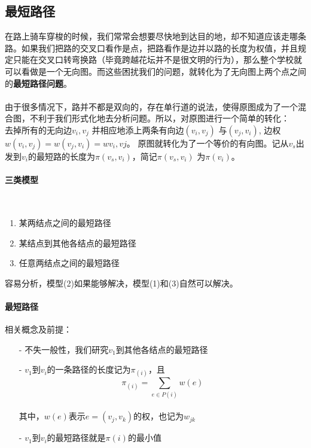\documentclass[11pt,a4paper,openany]{book}
\begin{document}
\subsection{最短路径}
\indent 在路上骑车穿梭的时候，我们常常会想要尽快地到达目的地，却不知道应该走哪条路。如果我们把路的交叉口看作是点，把路看作是边并以路的长度为权值，并且规定只能在交叉口转弯换路（毕竟跨越花坛并不是很文明的行为），那么整个学校就可以看做是一个无向图。而这些困扰我们的问题，就转化为了无向图上两个点之间的\textbf{最短路径问题}。\\
\paragraph{}由于很多情况下，路并不都是双向的，存在单行道的说法，使得原图成为了一个混合图，不利于我们形式化地去分析问题。所以，对原图进行一个简单的转化：\\
去掉所有的无向边${v_i,v_j}$ 并相应地添上两条有向边$(v_i,v_j)$ 与$(v_j,v_i)$, 边权$w(v_i,v_j) = w(v_j,v_i) = w{v_i,vj}$。
原图就转化为了一个等价的有向图。记从$v_s$出发到$v_i$的最短路的长度为$\pi(v_s,v_i)$，简记$\pi(v_s, v_i)$ 为$\pi(v_i)$。
\paragraph{三类模型}\\
\begin{enumerate}
  \item 某两结点之间的最短路径
  \item 某结点到其他各结点的最短路径
  \item 任意两结点之间的最短路径
\end{enumerate}
容易分析，模型(2)如果能够解决，模型(1)和(3)自然可以解决。
\paragraph{最短路径}相关概念及前提：\\
\begin{itemize}
  \item[-] 不失一般性，我们研究$v_1$到其他各结点的最短路径
  \item[-] $v_1$到$v_i$的一条路径的长度记为$\pi_{(i)}$，且$$\pi_{(i)}=\sum_{e\in P(i)}w(e)$$\\
  其中，$w(e)$表示$e=(v_j,v_k)$的权，也记为$w_{jk}$
  \item[-] $v_1$到$v_i$的最短路径就是$\pi(i)$的最小值
\end{itemize}
\end{document}
